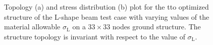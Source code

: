 \begin{figure}
    \centering
    \hspace*{\fill}
    \hfill
    \hspace*{\fill}
    \caption{Topology (a) and stress distribution (b) plot for the \gls{tto} optimized structure of the L-shape beam test case with varying values of the material allowable $\sigma_\text{L}$ on a $33 \times 33$ nodes ground structure. The structure topology is invariant with respect to the value of $\sigma_\text{L}$.}
    \label{fig:03_L_tto}
\end{figure}


